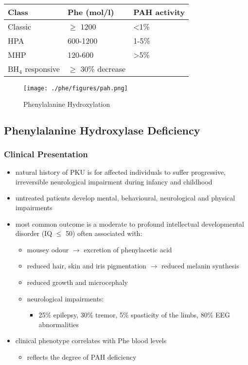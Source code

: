 \documentclass{scrartcl}
\begin{document}
\begin{table}[htbp]
\label{tab:orgef09097}
\centering
\begin{tabular}{lll}
Class & Phe (\textmu{}mol/l) & PAH activity\\
\hline
Classic & \(\ge\) 1200 & \textless{}1\%\\
HPA & 600-1200 & 1-5\%\\
MHP & 120-600 & \textgreater{}5\%\\
BH\(_{\text{4}}\) responsive & \(\ge\) 30\% decrease & \\
\end{tabular}
\end{table}

\begin{figure}[htbp]
\centering
\texttt{[image: ./phe/figures/pah.png]}
\caption{\label{fig:orgfbb0cdf}
Phenylalanine Hydroxylation}
\end{figure}

\subsection{Phenylalanine Hydroxylase Deficiency}
\label{sec:orgd5531cb}
\subsubsection{Clinical Presentation}
\label{sec:org0380d6b}
\begin{itemize}
\item natural history of PKU is for affected individuals to suffer
progressive, irreversible neurological impairment during infancy and
childhood
\item untreated patients develop mental, behavioural, neurological and
physical impairments
\item most common outcome is a moderate to profound intellectual
developmental disorder (IQ \(\le\) 50) often associated with:
\begin{itemize}
\item mousey odour \(\to\) excretion of phenylacetic acid
\item reduced hair, skin and iris pigmentation \(\to\) reduced melanin synthesis
\item reduced growth and microcephaly
\item neurological impairments:
\begin{itemize}
\item 25\% epilepsy, 30\% tremor, 5\% spasticity of the limbs, 80\% EEG abnormalities
\end{itemize}
\end{itemize}
\item clinical phenotype correlates with Phe blood levels
\begin{itemize}
\item reflects the degree of PAH deficiency
\end{itemize}
\end{itemize}
\end{document}
